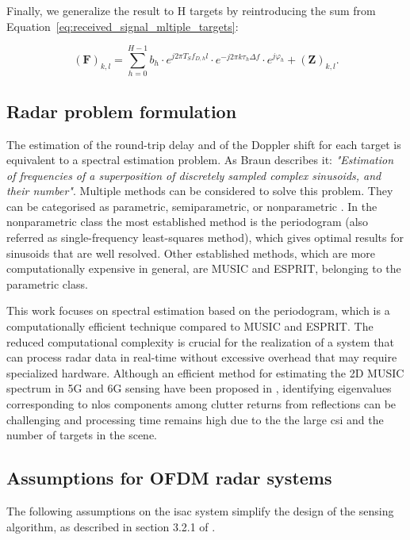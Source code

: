    Finally, we generalize the result to H targets by reintroducing the sum from Equation~\eqref{eq:received_signal_mltiple_targets}:
    
    \begin{equation*}
        (\mathbf F)_{k,l} =  \sum_{h=0}^{H-1} b_h \cdot e^{j2\pi T_S f_{D,h} l}\cdot e^{-j2\pi k \tau_h \Delta f} \cdot e^{j\varphi_h} + (\mathbf{Z})_{k,l}.
    \end{equation*}
    
    \subsection{Radar problem formulation}
    
    The estimation of the round-trip delay and of the Doppler shift for each target is equivalent to a spectral estimation problem. As Braun describes it: \textit{"Estimation of frequencies of a superposition of discretely sampled complex sinusoids, and their number"}.
    Multiple methods can be considered to solve this problem. They can be categorised as parametric, semiparametric, or nonparametric \cite{Stoica_New_Method_Parameter_Estimation}. 
    In the nonparametric class the most established method is the periodogram (also referred as single-frequency least-squares method), which gives optimal results for sinusoids that are well resolved.
    Other established methods, which are more computationally expensive in general, are MUSIC and ESPRIT, belonging to the parametric class.
    
    This work focuses on spectral estimation based on the periodogram, which is a computationally efficient technique compared to MUSIC and ESPRIT.
    The reduced computational complexity is crucial for the realization of a system that can process radar data in real-time without excessive overhead that may require specialized hardware.
    Although an efficient method for estimating the 2D MUSIC spectrum in 5G and 6G sensing have been proposed in \cite{Henninger_Mandelli_Arnold_EfficientMUSIC}, identifying eigenvalues corresponding to \gls{nlos} components among clutter returns from reflections can be challenging and processing time remains high due to the the large \gls{csi} and the number of targets in the scene.
    
    
    \subsection{Assumptions for OFDM radar systems}
    \label{sub:assumptions_ofdm_radar}
    The following assumptions on the \gls{isac} system simplify the design of the sensing algorithm, as described in section 3.2.1 of \cite{Braun2014OFDMRA}.
    
